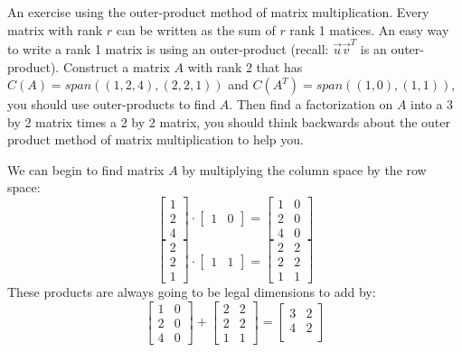 \documentclass[]{exam}
\begin{document}
\begin{questions}
	\question An exercise using the outer-product method of matrix multiplication. Every matrix with rank $r$ can be written as the sum of $r$ rank 1 matices. An easy way to write a rank 1 matrix is using an outer-product (recall: $\vec{u}\vec{v}^T$ is an outer-product). Construct a matrix $A$ with rank 2 that has $C(A) = span((1,2,4), (2,2,1))$ and $C(A^T) = span((1,0),(1,1))$, you should use outer-products to find $A$. Then find a factorization on $A$ into a 3 by 2 matrix times a 2 by 2 matrix, you should think backwards about the outer product method of matrix multiplication to help you.

\begin{solution}
	We can begin to find matrix $A$ by multiplying the column space by the row space:
	\[
		\begin{bmatrix}
			1 \\ 2 \\ 4
		\end{bmatrix} \cdot
		\begin{bmatrix}
			1 & 0
		\end{bmatrix} = 
		\begin{bmatrix}
			1 & 0 \\
			2 & 0 \\
			4 & 0 
		\end{bmatrix}
	\]
	\[
		\begin{bmatrix}
			2 \\ 2 \\ 1
		\end{bmatrix} \cdot 
		\begin{bmatrix}
			1 & 1
		\end{bmatrix} =
		\begin{bmatrix}
			2 & 2 \\
			2 & 2 \\
			1 & 1
		\end{bmatrix}
	\]
	These products are always going to be legal dimensions to add by:
	\[
		\begin{bmatrix}
			1 & 0 \\
			2 & 0 \\
			4 & 0 
		\end{bmatrix} +
		\begin{bmatrix}
			2 & 2 \\
			2 & 2 \\
			1 & 1
		\end{bmatrix} = 
		\begin{bmatrix}
			3 & 2 \\
			4 & 2 \\

\end{bmatrix}\]
\end{solution}
\end{questions}
\end{document}
